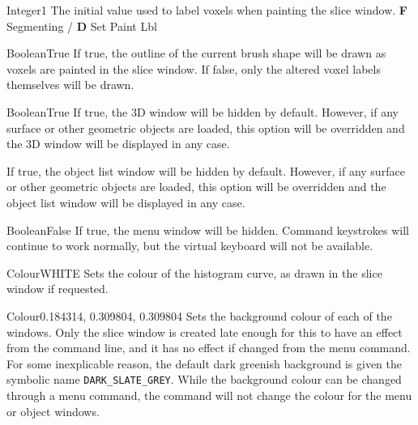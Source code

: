 {Integer}{1}
{The initial value used to label voxels when painting the slice window.}
{{\bf F} Segmenting / {\bf D} Set Paint Lbl}




{Boolean}{True}
{If true, the outline of the current brush shape will be drawn as voxels are painted in the slice window. If false, only the altered voxel labels themselves will be drawn.}{}

{Boolean}{True}
{If true, the 3D window will be hidden by default. However, if any surface or other geometric objects are loaded, this option will be overridden and the 3D window will be displayed in any case.}{}

{If true, the object list window will be hidden by default. However, if any surface or other geometric objects are loaded, this option will be overridden and the object list window will be displayed in any case.}{}

{Boolean}{False}
{If true, the menu window will be hidden. Command keystrokes will continue to work normally, but the virtual keyboard will not be available.}{}

{Colour}{WHITE}
{Sets the colour of the histogram curve, as drawn in the slice window if requested.}{}

{Colour}{0.184314, 0.309804, 0.309804} 
{Sets the background colour of each of the windows. Only
the slice window is created late enough for this to have an effect
from the command line, and it has no effect if changed from the menu
command. For some inexplicable reason, the default dark greenish
background is given the symbolic name {\tt DARK\_SLATE\_GREY}. While the
background colour can be changed through a menu command, the command will not
change the colour for the menu or object windows.}{}


